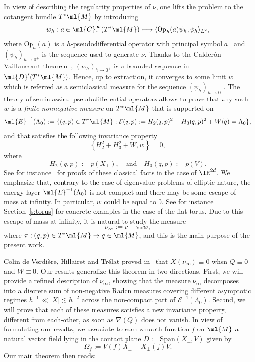 \documentclass[10pt]{amsart}
\newcommand\mto{\mathchoice{\longmapsto}{\mapsto}{\mapsto}{\mapsto}}
\theoremstyle{plain}
\theoremstyle{definition}
\theoremstyle{remark}
\newcommand{\Op}{\operatorname{Op}}
\begin{document}
In view of describing the regularity properties of $\nu$, one lifts the problem to the cotangent bundle $T^*\ml{M}$ by introducing
\[
w_h:a\in\ml{C}^{\infty}_c(T^*\ml{M})\mto\langle \Op_h(a)\psi_h,\psi_h\rangle_{L^2},
\]
where $\text{Op}_h(a)$ is a $h$-pseudodifferential operator with principal symbol $a$~\cite[Th.\,14.1]{Zworski12} and $(\psi_h)_{h\to 0^+}$ is the sequence used to generate $\nu$. Thanks to the Calderón-Vaillancourt theorem~\cite[Th.\,5.1]{Zworski12}, $(w_h)_{h\to 0^+}$ is a bounded sequence in $\ml{D}^\prime(T^*\ml{M})$. Hence, up to extraction, it converges to some limit $w$ which is referred as a semiclassical measure for the sequence $(\psi_h)_{h\to 0^+}$. The theory of semiclassical pseudodifferential operators allows to prove that any such $w$ is a \emph{finite nonnegative measure} on $T^*\ml{M}$ that is supported on
\[
\ml{E}^{-1}(\Lambda_0):=\{(q,p)\in T^*\ml{M}: \mathcal{E}(q,p) := H_2(q,p)^2+H_3(q,p)^2+W(q)=\Lambda_0\},
\]
and that satisfies the following invariance property
\[
\left\{H_2^2+H_3^2+W,w\right\}=0,
\]
where
\[
H_2(q,p):=p(X_\perp),\quad\text{and}\quad H_3(q,p):=p(V).
\]
See for instance~\cite[\S5.2]{Zworski12} for proofs of these classical facts in the case of $\IR^{2d}$. We emphasize that, contrary to the case of eigenvalue problems of elliptic nature, the energy layer $\ml{E}^{-1}(\Lambda_0)$ is not compact and there may be some escape of mass at infinity. In particular, $w$ could be equal to $0$. See for instance Section~\ref{s:torus} for concrete examples in the case of the flat torus. Due to this escape of mass at infinity, it is natural to study the measure
\[
\nu_\infty:=\nu-\pi_*w,
\]
where $\pi:(q,p)\in T^*\ml{M}\to q\in \ml{M}$, and this is the main purpose of the present work.


Colin de Verdière, Hillairet and Trélat proved in~\cite[Th.\,B]{ColindeVerdiereHillairetTrelat15} that $X(\nu_\infty)\equiv0$ when $Q\equiv0$ and $W\equiv 0$.
Our results generalize this theorem in two directions. First, we will provide a refined description of $\nu_\infty$, showing that the measure $\nu_\infty$ decomposes into a discrete sum of non-negative Radon measures covering different asymptotic regimes $h^{-1}\ll |X|\lesssim h^{-2}$ across the non-compact part of $\mathcal{E}^{-1}(\Lambda_0)$. Second, we will prove that each of these measures satisfies a new invariance property, different from each-other, as soon as $\nabla(Q)$ does not vanish. In view of formulating our results, we associate to each smooth function $f$ on $\ml{M}$ a natural vector field lying in the contact plane $D:=\text{Span}(X_\perp,V)$ given by
\[
\Omega_f:=V(f)X_\perp-X_\perp(f)V.
\]
Our main theorem then reads:
\end{document}
